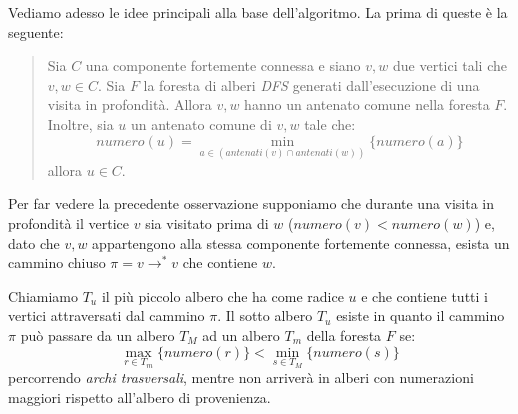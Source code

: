 Vediamo adesso le idee principali alla base dell'algoritmo. La prima
di queste \`e la seguente:
\begin{quotation}
  Sia $C$ una componente fortemente connessa e siano $v, w$ due
  vertici tali che $v, w \in C$. Sia $F$ la foresta di alberi
  \emph{DFS} generati dall'esecuzione di una visita in
  profondit\`a. Allora $v, w$ hanno un antenato comune nella foresta
  $F$. Inoltre, sia $u$ un antenato comune di $v, w$ tale che:
  \begin{displaymath}
    numero(u) = \min_{a \in (antenati(v)\cap antenati(w))}\lbrace numero(a)\rbrace
  \end{displaymath}
  allora $u \in C$.
\end{quotation}
Per far vedere la precedente osservazione supponiamo che durante una
visita in profondit\`a il vertice $v$ sia visitato prima di $w$
($numero(v) < numero(w)$) e, dato che $v,w$ appartengono alla stessa
componente fortemente connessa, esista un cammino chiuso $\pi = v
\rightarrow^{*} v$ che contiene $w$.

Chiamiamo $T_{u}$ il pi\`u piccolo albero che ha come radice $u$ e che
contiene tutti i vertici attraversati dal cammino $\pi$. Il sotto
albero $T_{u}$ esiste in quanto il cammino $\pi$ pu\`o passare da un
albero $T_{M}$ ad un albero $T_{m}$ della foresta $F$ se:
\begin{displaymath}
  \max_{r \in T_{m}}\{numero(r)\} < \min_{s \in T_{M}}\{numero(s)\}
\end{displaymath}
percorrendo \emph{archi trasversali}, mentre non arriver\`a in alberi
con numerazioni maggiori rispetto all'albero di provenienza.

